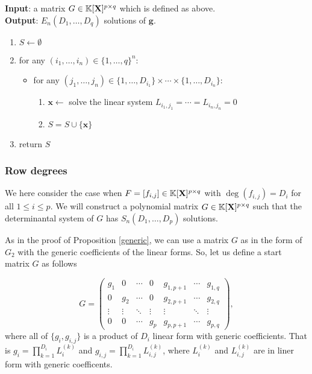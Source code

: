 \documentclass[11pt]{article}
\numberwithin{Property}{section}
\numberwithin{Theorem}{section}
\numberwithin{Proposition}{section}
\numberwithin{Lemma}{section}
\numberwithin{Corollary}{section}
\numberwithin{Definition}{section}
\numberwithin{Remark}{section}
\numberwithin{Conjecture}{section}
\numberwithin{Problem}{section}
\numberwithin{Claim}{section}
\theoremstyle{definition}
\numberwithin{Example}{section}
\def\g {\ensuremath{\mathbf{g}}}
\renewcommand{\leq}{\leqslant}
\newcommand{\field}{\mathbb{K}} %
\newcommand{\mat}[1]{\mathbf{\MakeUppercase{#1}}} %
\begin{document}
\begin{algorithm}
\caption{$\mathsf{Start Matrix Column Degrees}$}
\label{StartMatCol}
{\bf Input}: a matrix $G \in \field[\mat{X}]^{p \times q}$ which is defined as above.\\
{\bf Output}: $E_{n}(D_1, \ldots, D_q)$ solutions of $\g$. 

\begin{enumerate}
\item $S \gets \emptyset$
\item for any $(i_1, \ldots, i_{n}) \in \{1, \ldots, q \}^{n}$: 
\begin{itemize}
\item for any $(j_1, \ldots, j_n) \in \{1, \ldots, D_{i_1}\} \times \cdots \times \{1, \ldots, D_{i_n}\} $: 
\begin{enumerate}
\item $\mathbf{x} \gets$ solve the linear system $L_{i_1,j_1} = \cdots = L_{i_n,j_n} = 0$
\item $S = S \cup \{\mathbf{x}\}$
\end{enumerate}
\end{itemize}
\item return $S$
\end{enumerate}
\end{algorithm}
\subsubsection{Row degrees}
We here consider the case when $F = [f_{i,j}] \in \field[\mat{X}]^{p\times q}$ with $\deg({f_{i,j}}) = D_i$ for all $1 \leq i \leq p$. We will construct a polynomial matrix $G \in \field[\mat{X}]^{p \times q}$ such that the determinantal system of $G$ has $S_{n}(D_1, \ldots, D_p)$ solutions. 

As in the proof of Proposition \ref{generic}, we can use a matrix $G$ as in the form of $G_2$ with the generic coefficients of the linear forms. So, let us define a start matrix $G$ as follows 

\[ G = \left( \begin{matrix}
g_{1} & 0 & \cdots & 0 & g_{1,p+1} & \cdots & g_{1, q}\\
0 & g_{2} & \cdots & 0 & g_{2,p+1} & \cdots & g_{2, q}\\
\vdots & \vdots & \ddots & \vdots & \vdots & \ddots & \vdots\\
0 & 0 & \cdots & g_{p} & g_{p,p+1} & \cdots & g_{p, q}
\end{matrix} \right), \] where all of $\{g_i, g_{i,j}\}$ is a product of $D_i$ linear form with generic coefficients. That is $g_i = \prod_{k=1}^{D_i}L_i^{(k)}$ and $g_{i,j} = \prod_{k=1}^{D_i}L_{i,j}^{(k)}$, where $L_i^{(k)}$ and $L_{i,j}^{(k)}$ are in liner form with generic coefficents. 
\end{document}
